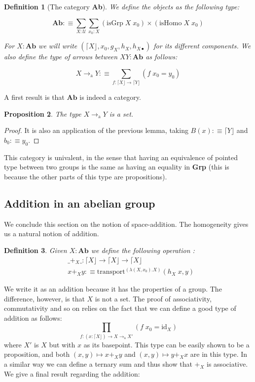 \documentclass{article}
\newtheorem{defi}{Definition}
\newtheorem{prop}[defi]{Proposition}
\begin{document}
\begin{defi}[The category \textbf{Ab}]
    We define the objects as the following type:

    $$\textbf{Ab} :\equiv \sum_{X : \mathcal U}\sum_{x_0 : X} (\mathrm{isGrp}\;X\;x_0)\times 
        (\mathrm{isHomo}\;X\;x_0)$$

    For $X : \textbf{Ab}$ we will write $(\lceil X \rfloor,x_0,g_X,h_X,h_{X\bullet})$ for its different
    components. We also define the type of arrows between $X Y : \textbf{Ab}$ as follows:

    $$X\to_\mathrm a Y :\equiv \sum_{f : \lceil X \rfloor \to \lceil Y\rfloor} (f\;x_0 = y_0)$$
    
\end{defi}

A first result is that $\textbf{Ab}$ is indeed a category.

\begin{prop}
    The type $X\to_\mathrm a Y$ is a set.
\end{prop}

\begin{proof}
    It is also an application of the previous lemma, taking $B(x) :\equiv \lceil Y \rfloor$
    and $b_0 :\equiv y_0$.
\end{proof}

This category is univalent, in the sense that having an equivalence of pointed type between two groups is
the same as having an equality in \textbf{Grp} (this is because the other parts of this type are
propositions).

\subsection{Addition in an abelian group}

We conclude this section on the notion of space-addition. The homogeneity gives us a natural notion of
addition.

\begin{defi}
    Given $X : \textbf{Ab}$ we define the following operation :
    \begin{align*}
        &\_+_X\_ : \lceil X \rfloor \to \lceil X \rfloor \to \lceil X \rfloor \\
        &x+_Xy :\equiv \mathrm{transport}^{(\lambda (X,x_0).X)}(h_X\;x,y)
    \end{align*}
\end{defi}

We write it as an addition because it has the properties of a group. The difference, however,
is that $X$ is not a set. The proof of associativity, commutativity and so on relies on the fact that we can
define a good type of addition as follows:
    $$\prod_{f : (x : \lceil X \rfloor) \to X \to_\mathrm a X'} (f\; x_0 = \mathrm{id}_X)$$
where $X'$ is $X$ but with $x$ as its basepoint. This type can be easily shown to be a proposition, and both
$(x,y)\mapsto x +_X y$ and $(x,y)\mapsto y+_Xx$ are in this type. In a similar way we can define a ternary
sum and thus show that $+_X$ is associative. We give a final result regarding the addition:
\end{document}
